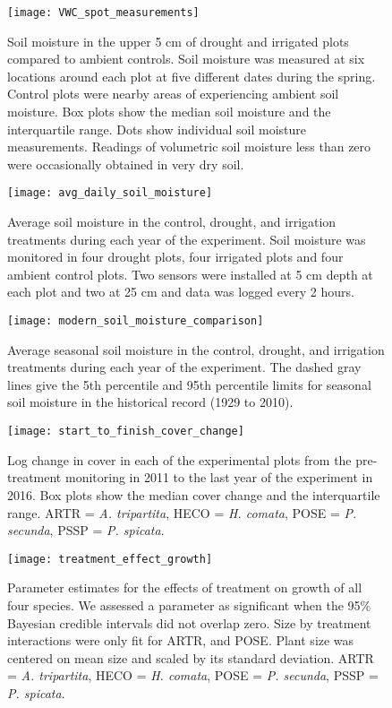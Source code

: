 \documentclass[11pt]{article}
\begin{document}
\begin{figure}[!htbp]
	\centering
	\texttt{[image: VWC\_spot\_measurements]}
	\caption{Soil moisture in the upper 5 cm of drought and irrigated plots compared to ambient controls. Soil moisture was measured at six locations around each plot at five different dates during the spring. Control plots were nearby areas of experiencing ambient soil moisture. Box plots show the median soil moisture and the interquartile range.  Dots show individual soil moisture measurements. Readings of volumetric soil moisture less than zero were occasionally obtained in very dry soil.}
	\label{fig:spotVWC}
\end{figure}


\begin{figure}[!htbp]
	\centering
	\texttt{[image: avg\_daily\_soil\_moisture]}
	\caption{Average soil moisture in the control, drought, and irrigation treatments during each year of the experiment.  Soil moisture was monitored in four drought plots, four irrigated plots and four ambient control plots. Two sensors were installed at 5 cm depth at each plot and two at 25 cm and data was logged every 2 hours.}
	\label{fig:dailyVWC}
\end{figure}


\begin{figure}[!htbp]
	\centering
	\texttt{[image: modern\_soil\_moisture\_comparison]}
	\caption{Average seasonal soil moisture in the control, drought, and irrigation treatments during each year of the experiment. The dashed gray lines give the 5th percentile and 95th percentile limits for seasonal soil moisture in the historical record (1929 to 2010). }
	\label{fig:seasonalVWC}
\end{figure}


\begin{figure}[!htbp]
	\centering
	\texttt{[image: start\_to\_finish\_cover\_change]}
	\caption{Log change in cover in each of the experimental plots from the pre-treatment monitoring in 2011 to the last year of the experiment in 2016. Box plots show the median cover change and the interquartile range. ARTR = \textit{A. tripartita}, HECO = \textit{H. comata}, POSE = \textit{P. secunda}, PSSP = \textit{P. spicata}.}
	\label{fig:coverChange}
\end{figure}

\begin{figure}[!htbp]
	\centering
	\texttt{[image: treatment\_effect\_growth]}
	\caption{Parameter estimates for the effects of treatment on growth of all four species. We assessed a parameter as significant when the 95\% Bayesian credible intervals did not overlap zero. Size by treatment interactions were only fit for ARTR, and POSE. Plant size was centered on mean size and scaled by its standard deviation. ARTR = \textit{A. tripartita}, HECO = \textit{H. comata}, POSE = \textit{P. secunda}, PSSP = \textit{P. spicata}. }
	\label{fig:growthTreat}
\end{figure}
\end{document}

